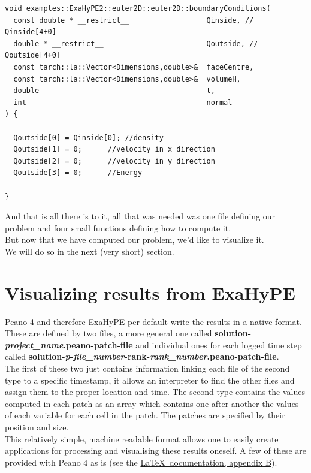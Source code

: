 \documentclass[12pt,letterpaper]{article}
\begin{document}
\begin{lstlisting}[style = C++]
void examples::ExaHyPE2::euler2D::euler2D::boundaryConditions(
  const double * __restrict__                  Qinside, // Qinside[4+0]
  double * __restrict__                        Qoutside, // Qoutside[4+0]
  const tarch::la::Vector<Dimensions,double>&  faceCentre,
  const tarch::la::Vector<Dimensions,double>&  volumeH,
  double                                       t,
  int                                          normal
) {
  
  Qoutside[0] = Qinside[0]; //density
  Qoutside[1] = 0;	    //velocity in x direction
  Qoutside[2] = 0;	    //velocity in y direction
  Qoutside[3] = 0;	    //Energy
  
}
\end{lstlisting}


And that is all there is to it, all that was needed was one file defining our problem and four small functions defining how to compute it. \\
But now that we have computed our problem, we'd like to visualize it.\\
We will do so in the next (very short) section.

\newpage

\section{Visualizing results from ExaHyPE}
\label{Visualize}

\vspace{0.3cm}

Peano 4 and therefore ExaHyPE per default write the results in a native format. These are defined by two files, a more general one called \textbf{solution-\textit{project\_name}.peano-patch-file} and individual ones for each logged time step called \textbf{solution-\textit{p}-\textit{file\_number}-rank-\textit{rank\_number}.peano-patch-file}.\\
The first of these two just contains information linking each file of the second type to a specific timestamp, it allows an interpreter to find the other files and assign them to the proper location and time. The second type contains the values computed in each patch as an array which contains one after another the values of each variable for each cell in the patch. The patches are specified by their position and size.\\
This relatively simple, machine readable format allows one to easily create applications for processing and visualising these results oneself. A few of these are provided with Peano 4 as is (see the \hyperlink{http://www.peano-framework.org/peano/p4/\LaTeX~documentation.pdf}{\LaTeX~documentation, appendix B}).
\end{document}
